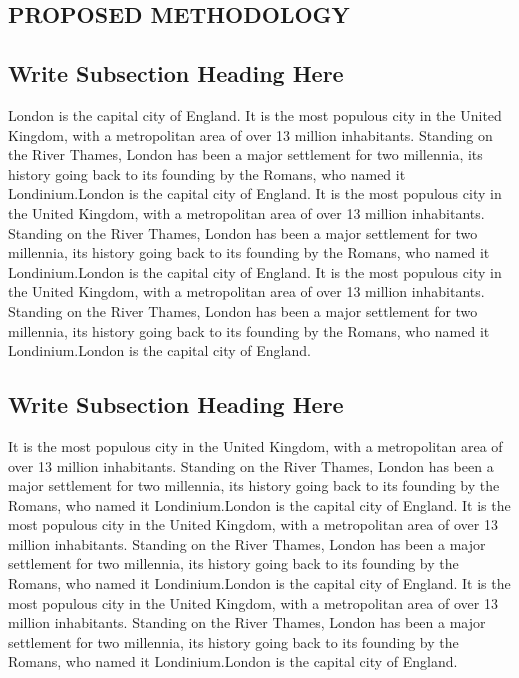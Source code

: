 \begin{center}
	\justifying
	\chapter{PROPOSED METHODOLOGY}
	
	\section{Write Subsection Heading Here} 
	London is the capital city of England. It is the most populous city in the United Kingdom, with a metropolitan area of over 13 million inhabitants. Standing on the River Thames, London has been a major settlement for two millennia, its history going back to its founding by the Romans, who named it Londinium.London is the capital city of England. It is the most populous city in the United Kingdom, with a metropolitan area of over 13 million inhabitants. Standing on the River Thames, London has been a major settlement for two millennia, its history going back to its founding by the Romans, who named it Londinium.London is the capital city of England. It is the most populous city in the United Kingdom, with a metropolitan area of over 13 million inhabitants. Standing on the River Thames, London has been a major settlement for two millennia, its history going back to its founding by the Romans, who named it Londinium.London is the capital city of England.\\
	
	\section{Write Subsection Heading Here} 
	It is the most populous city in the United Kingdom, with a metropolitan area of over 13 million inhabitants. Standing on the River Thames, London has been a major settlement for two millennia, its history going back to its founding by the Romans, who named it Londinium.London is the capital city of England. It is the most populous city in the United Kingdom, with a metropolitan area of over 13 million inhabitants. Standing on the River Thames, London has been a major settlement for two millennia, its history going back to its founding by the Romans, who named it Londinium.London is the capital city of England. It is the most populous city in the United Kingdom, with a metropolitan area of over 13 million inhabitants. Standing on the River Thames, London has been a major settlement for two millennia, its history going back to its founding by the Romans, who named it Londinium.London is the capital city of England.\\
	

\end{center}
